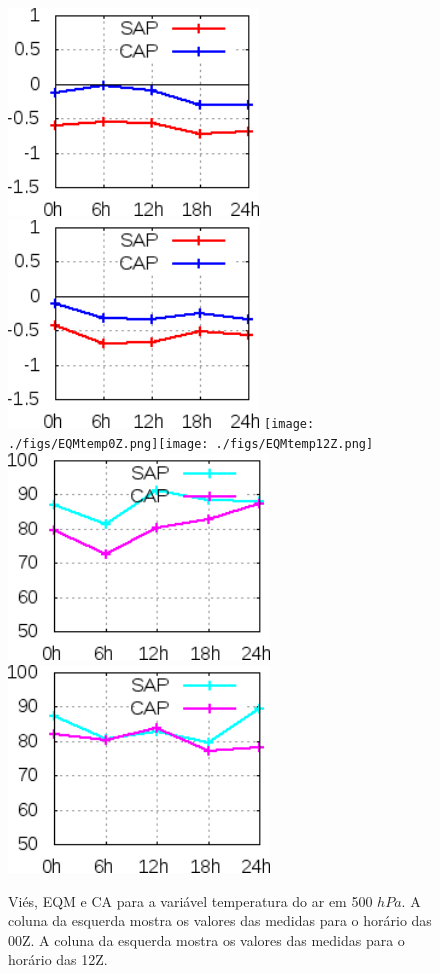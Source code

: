 \begin{figure}[!hbp]
\includegraphics[height=5.5cm]{./figs/VIES500temp0Z.png}\includegraphics[height=5.5cm]{./figs/VIES500temp12Z.png}
\texttt{[image: ./figs/EQMtemp0Z.png]}\texttt{[image: ./figs/EQMtemp12Z.png]}
\includegraphics[height=5.5cm]{./figs/CA500temp0Z.png}\includegraphics[height=5.5cm]{./figs/CA500temp12Z.png}
\caption{Viés, EQM e CA para a variável temperatura do ar em 500 $hPa$. A coluna da esquerda mostra os valores das medidas para o horário das 00Z. A coluna da esquerda mostra os valores das medidas para o horário das 12Z.}
\label{fig56}
\end{figure}

